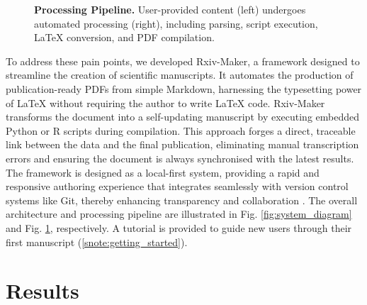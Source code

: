 \documentclass[times, twoside]{rxiv_maker_style}
\begin{document}
\begin{figure}[t]
\centering
{}
\begingroup\captionsetup{width=\textwidth,singlelinecheck=false,justification=justified}\setlength{\abovecaptionskip}{6pt}\setlength{\belowcaptionskip}{6pt}\ifdefined\justifying\justifying\fi\caption{\textbf{Processing Pipeline.} User-provided content (left) undergoes automated processing (right), including parsing, script execution, LaTeX conversion, and PDF compilation.}\label{fig:workflow}\endgroup
\end{figure}


To address these pain points, we developed Rxiv-Maker, a framework designed to streamline the creation of scientific manuscripts. It automates the production of publication-ready PDFs from simple Markdown, harnessing the typesetting power of LaTeX without requiring the author to write LaTeX code. Rxiv-Maker transforms the document into a self-updating manuscript by executing embedded Python or R scripts during compilation. This approach forges a direct, traceable link between the data and the final publication, eliminating manual transcription errors and ensuring the document is always synchronised with the latest results. The framework is designed as a local-first system, providing a rapid and responsive authoring experience that integrates seamlessly with version control systems like Git, thereby enhancing transparency and collaboration \cite{Ram2013_git_science,Perez-Riverol2016_github_bioinformatics}. The overall architecture and processing pipeline are illustrated in Fig. \ref{fig:system_diagram} and Fig. \ref{fig:workflow}, respectively. A tutorial is provided to guide new users through their first manuscript (\ref{snote:getting_started}).

\section*{Results}
\end{document}
